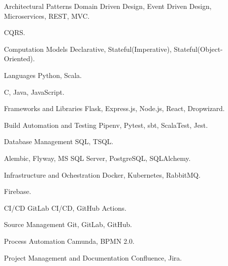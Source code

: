   \begin{cvskills}
    \cvskill
      {Architectural Patterns}
      { Domain Driven Design, Event Driven Design, Microservices, REST, MVC.}

    \cvskill
      {}
      { CQRS.}

    \cvskill
      {Computation Models}
      { Declarative, Stateful(Imperative), Stateful(Object-Oriented).}

    \cvskill
      {Languages}
      { Python, Scala.}

    \cvskill
      {}
      { C, Java, JavaScript.}

    \cvskill
      {Frameworks and Libraries}
      { Flask, Express.js, Node.js, React, Dropwizard.}

    \cvskill
      {Build Automation and Testing}
      { Pipenv, Pytest, sbt, ScalaTest, Jest.}

    \cvskill
      {Database Management}
      { SQL, TSQL.}

    \cvskill
      {}
      { Alembic, Flyway, MS SQL Server, PostgreSQL, SQLAlchemy.}

    \cvskill
      {Infrastructure and Ochestration}
      { Docker, Kubernetes, RabbitMQ.}

    \cvskill
      {}
      { Firebase.}

    \cvskill
      {CI/CD}
      { GitLab CI/CD, GitHub Actions.}

    \cvskill
      {Source Management}
      { Git, GitLab, GitHub.}

    \cvskill
      {Process Automation}
      { Camunda, BPMN 2.0.}

    \cvskill
      {Project Management and Documentation}
      { Confluence, Jira.}
  \end{cvskills}

